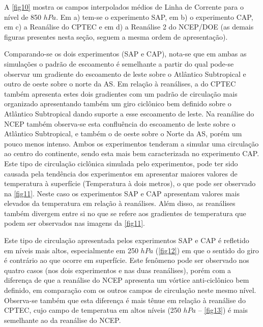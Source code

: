 A \autoref{fig10} mostra os campos interpolados médios de Linha de Corrente para o nível de 850 $hPa$. Em a) tem-se o experimento SAP, em b) o experimento CAP, em c) a Reanálise do CPTEC e em d) a Reanálise 2 do NCEP/DOE (as demais figuras presentes nesta seção, seguem a mesma ordem de apresentação).

Comparando-se os dois experimentos (SAP e CAP), nota-se que em ambas as simulações o padrão de escoamento é semelhante a partir do qual pode-se observar um gradiente do escoamento de leste sobre o Atlântico Subtropical e outro de oeste sobre o norte da AS. Em relação à reanálises, a do CPTEC também apresenta estes dois gradientes com um padrão de circulação mais organizado apresentando também um giro ciclônico bem definido sobre o Atlântico Subtropical dando suporte a esse escoamento de leste. Na reanálise do NCEP também observa-se esta confluência do escoamento de leste sobre o Atlântico Subtropical, e também o de oeste sobre o Norte da AS, porém um pouco menos intenso. Ambos os experimentos tenderam a simular uma circulação ao centro do continente, sendo esta mais bem caracterizada no experimento CAP. Este tipo de circulação ciclônica simulada pelo experimentos, pode ter sido causada pela tendência dos experimentos em apresentar maiores valores de temperatura à superfície (Temperatura à dois metros), o que pode ser observado na \autoref{fig11}. Neste caso os experimentos SAP e CAP apresentam valores mais elevados da temperatura em relação à reanálises. Além disso, as reanálises também divergem entre si no que se refere aos gradientes de temperatura que podem ser observados nas imagens da \autoref{fig11}. 

Este tipo de circulação apresentada pelos experimentos SAP e CAP é refletido em níveis mais altos, especialmente em 250 $hPa$ (\autoref{fig12}) em que o sentido do giro é contrário ao que ocorre em superfície. Este fenômeno pode ser observado nos quatro casos (nos dois experimentos e nas duas reanálises), porém com a diferença de que a reanálise do NCEP apresenta um vórtice anti-ciclônico bem definido, em comparação com os outros campos de circulação neste mesmo nível. Observa-se também que esta diferença é mais tênue em relação à reanálise do CPTEC, cujo campo de temperatua em altos níveis (250 $hPa$ – \autoref{fig13}) é mais semelhante ao da reanálise do NCEP.

